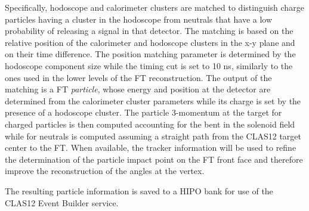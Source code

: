 Specifically, hodoscope and calorimeter clusters are matched to distinguish charge particles having a cluster in the hodoscope from neutrals that have a low probability of releasing a signal in that detector. The matching is based on the relative position of the calorimeter and hodoscope clusters in the x-y plane and on their time difference. The position matching parameter is determined by the hodoscope component size while the timing cut is set to 10 ns, similarly to the ones used in the lower levels of the FT reconstruction. The output of the matching is a FT {\it particle}, whose energy and position at the detector are determined from the calorimeter cluster parameters while its charge is set by the presence of a hodoscope cluster. The particle 3-momentum at the target for charged particles is then computed accounting for the bent in the solenoid field while for neutrals is computed assuming a straight path from the CLAS12 target center to the FT. When available, the tracker information will be used to refine the determination of the particle impact point on the FT front face and therefore improve the reconstruction of the angles at the vertex.

The resulting particle information is saved to a HIPO bank for use of the CLAS12 Event Builder service.
